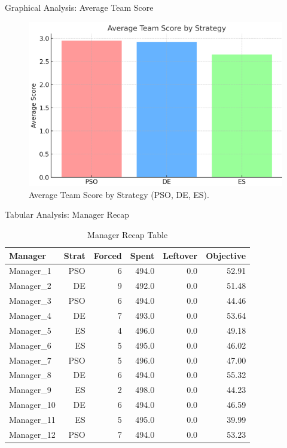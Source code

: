 \documentclass{beamer}
\begin{document}
	\begin{frame}{Graphical Analysis: Average Team Score}
		\begin{figure}[H]
			\centering
			\includegraphics[width=0.8\linewidth]{plot/average_team_score_strategy.png}
			\caption{Average Team Score by Strategy (PSO, DE, ES).}
		\end{figure}
	\end{frame}
	
	\begin{frame}{Tabular Analysis: Manager Recap}
		\begin{table}[H]
			\centering
			\caption{Manager Recap Table}
			\begin{tabular}{lrrrrr}
				\toprule
				\textbf{Manager} & \textbf{Strat} & \textbf{Forced} & \textbf{Spent} & \textbf{Leftover} & \textbf{Objective} \\
				\midrule
				Manager\_1  & PSO & 6 & 494.0 & 0.0 & 52.91 \\
				Manager\_2  & DE  & 9 & 492.0 & 0.0 & 51.48 \\
				Manager\_3  & PSO & 6 & 494.0 & 0.0 & 44.46 \\
				Manager\_4  & DE  & 7 & 493.0 & 0.0 & 53.64 \\
				Manager\_5  & ES  & 4 & 496.0 & 0.0 & 49.18 \\
				Manager\_6  & ES  & 5 & 495.0 & 0.0 & 46.02 \\
				Manager\_7  & PSO & 5 & 496.0 & 0.0 & 47.00 \\
				Manager\_8  & DE  & 6 & 494.0 & 0.0 & 55.32 \\
				Manager\_9  & ES  & 2 & 498.0 & 0.0 & 44.23 \\
				Manager\_10 & DE  & 6 & 494.0 & 0.0 & 46.59 \\
				Manager\_11 & ES  & 5 & 495.0 & 0.0 & 39.99 \\
				Manager\_12 & PSO & 7 & 494.0 & 0.0 & 53.23 \\
				\bottomrule
			\end{tabular}
		\end{table}
	\end{frame}
	
\end{document}
